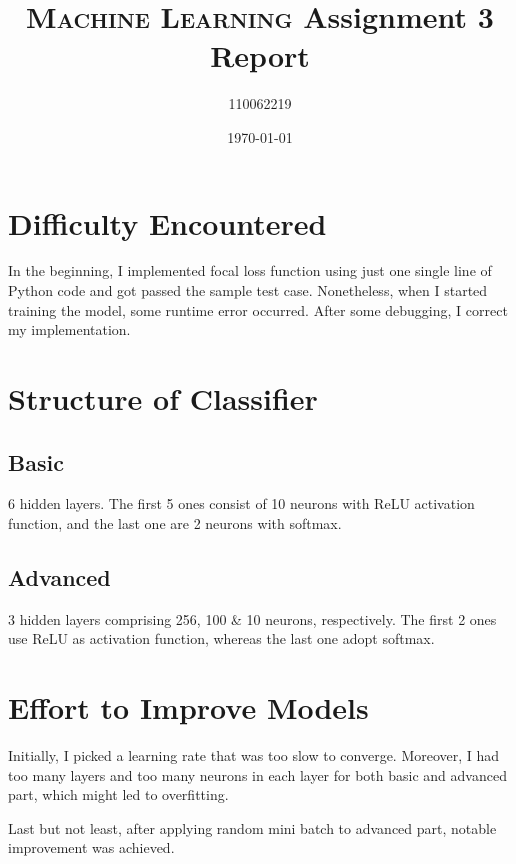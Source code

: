 \documentclass[12pt, a4paper]{article}
\title{\textsc{Machine Learning} Assignment 3 Report}
\author{110062219}
\date{\today}
\begin{document}
\maketitle

\section{Difficulty Encountered}

In the beginning, I implemented focal loss function using just one single line of Python code and got passed the sample test case. Nonetheless, when I started training the model, some runtime error occurred. After some debugging, I correct my implementation.

\section{Structure of Classifier}

\subsection{Basic}

6 hidden layers. The first 5 ones consist of 10 neurons with ReLU activation function, and the last one are 2 neurons with softmax.

\subsection{Advanced}

3 hidden layers comprising 256, 100 \& 10 neurons, respectively. The first 2 ones use ReLU as activation function, whereas the last one adopt softmax.

\section{Effort to Improve Models}

Initially, I picked a learning rate that was too slow to converge. Moreover, I had too many layers and too many neurons in each layer for both basic and advanced part, which might led to overfitting.

Last but not least, after applying random mini batch to advanced part, notable improvement was achieved.

%
\end{document}
